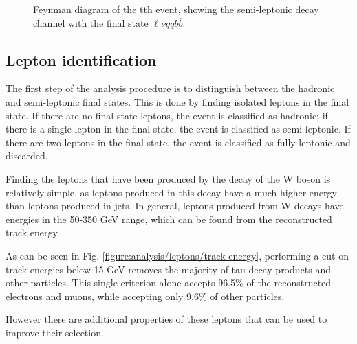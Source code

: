 \begin{figure}
	\caption{Feynman diagram of the tth event, showing the semi-leptonic decay channel  with the final state $\ell\nu q\overline{q}b\overline{b}$.}
	\label{figure:physics/SM/feynman-tth-semileptonic}
\end{figure}

\subsection{Lepton identification}
The first step of the analysis procedure is to distinguish between the hadronic and semi-leptonic final states. This is done by finding isolated leptons in the final state. If there are no final-state leptons, the event is classified as hadronic; if there is a single lepton in the final state, the event is classified as semi-leptonic. If there are two leptons in the final state, the event is classified as fully leptonic and discarded.

Finding the leptons that have been produced by the decay of the W boson is relatively simple, as leptons produced in this decay have a much higher energy than leptons produced in jets. In general, leptons produced from W decays have energies in the 50-350 GeV range, which can be found from the reconstructed track energy.

As can be seen in Fig. \ref{figure:analysis/leptons/track-energy}, performing a cut on track energies below 15 GeV removes the majority of tau decay products and other particles. This single criterion alone accepts 96.5\% of the reconstructed electrons and muons, while accepting only 9.6\% of other particles. 

However there are additional properties of these leptons that can be used to improve their selection.

